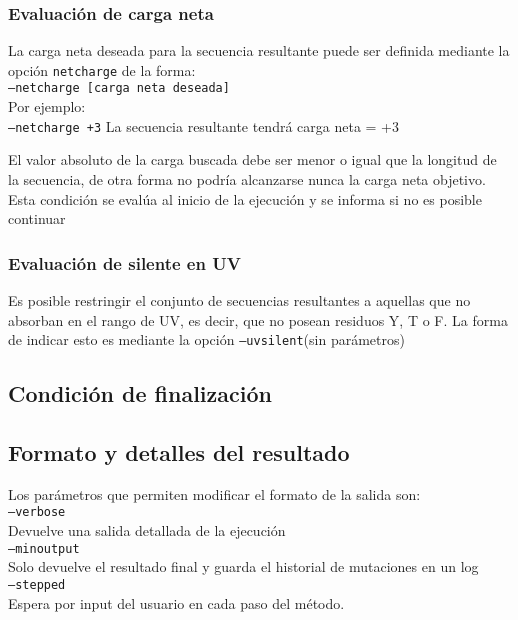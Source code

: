 \subsubsection{Evaluación de carga neta}

La carga neta deseada para la secuencia resultante puede ser definida mediante la opción \texttt{netcharge} de la forma: \\
\indent \texttt{--netcharge [carga neta deseada]} 
\\Por ejemplo: \\
\indent \texttt{--netcharge +3} \hspace{0.5cm} La secuencia resultante tendrá carga neta = +3

El valor absoluto de la carga buscada debe ser menor o igual que la longitud de la secuencia, de otra forma no podría alcanzarse nunca la carga neta objetivo.
Esta condición se evalúa al inicio de la ejecución y se informa si no es posible continuar


\subsubsection{Evaluación de silente en UV}\label{uvsilent}

Es posible restringir el conjunto de secuencias resultantes a aquellas que no absorban en el rango de UV, es decir, que no posean residuos Y, T o F.
La forma de indicar esto es mediante la opción \texttt{--uvsilent}(sin parámetros)



\subsection{Condición de finalización} \label{condicionFin}

\subsection{Formato y detalles del resultado}\label{output}
Los parámetros que permiten modificar el formato de la salida son:
\vspace{0.2cm}\\
\texttt{--verbose} \\
\indent \indent Devuelve una salida detallada de la ejecución \\
\texttt{--minoutput} \\
\indent \indent Solo devuelve el resultado final y guarda el historial de mutaciones en un log \\
\texttt{--stepped} \\
\indent \indent Espera por input del usuario en cada paso del método. \\

